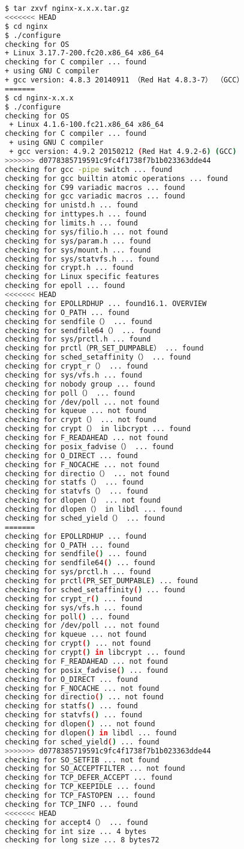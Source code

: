 \begin{lstlisting}[language=bash]
$ tar zxvf nginx-x.x.x.tar.gz
<<<<<<< HEAD
$ cd nginx
$ ./configure
checking for OS
+ Linux 3.17.7-200.fc20.x86_64 x86_64
checking for C compiler ... found
+ using GNU C compiler
+ gcc version: 4.8.3 20140911 （Red Hat 4.8.3-7） （GCC）
=======
$ cd nginx-x.x.x
$ ./configure
checking for OS
 + Linux 4.1.6-100.fc21.x86_64 x86_64
checking for C compiler ... found
 + using GNU C compiler
 + gcc version: 4.9.2 20150212 (Red Hat 4.9.2-6) (GCC) 
>>>>>>> d0778385719591c9fc4f1738f7b1b023363dde44
checking for gcc -pipe switch ... found
checking for gcc builtin atomic operations ... found
checking for C99 variadic macros ... found
checking for gcc variadic macros ... found
checking for unistd.h ... found
checking for inttypes.h ... found
checking for limits.h ... found
checking for sys/filio.h ... not found
checking for sys/param.h ... found
checking for sys/mount.h ... found
checking for sys/statvfs.h ... found
checking for crypt.h ... found
checking for Linux specific features
checking for epoll ... found
<<<<<<< HEAD
checking for EPOLLRDHUP ... found16.1. OVERVIEW
checking for O_PATH ... found
checking for sendfile（） ... found
checking for sendfile64（） ... found
checking for sys/prctl.h ... found
checking for prctl（PR_SET_DUMPABLE） ... found
checking for sched_setaffinity（） ... found
checking for crypt_r（） ... found
checking for sys/vfs.h ... found
checking for nobody group ... found
checking for poll（） ... found
checking for /dev/poll ... not found
checking for kqueue ... not found
checking for crypt（） ... not found
checking for crypt（） in libcrypt ... found
checking for F_READAHEAD ... not found
checking for posix_fadvise（） ... found
checking for O_DIRECT ... found
checking for F_NOCACHE ... not found
checking for directio（） ... not found
checking for statfs（） ... found
checking for statvfs（） ... found
checking for dlopen（） ... not found
checking for dlopen（） in libdl ... found
checking for sched_yield（） ... found
=======
checking for EPOLLRDHUP ... found
checking for O_PATH ... found
checking for sendfile() ... found
checking for sendfile64() ... found
checking for sys/prctl.h ... found
checking for prctl(PR_SET_DUMPABLE) ... found
checking for sched_setaffinity() ... found
checking for crypt_r() ... found
checking for sys/vfs.h ... found
checking for poll() ... found
checking for /dev/poll ... not found
checking for kqueue ... not found
checking for crypt() ... not found
checking for crypt() in libcrypt ... found
checking for F_READAHEAD ... not found
checking for posix_fadvise() ... found
checking for O_DIRECT ... found
checking for F_NOCACHE ... not found
checking for directio() ... not found
checking for statfs() ... found
checking for statvfs() ... found
checking for dlopen() ... not found
checking for dlopen() in libdl ... found
checking for sched_yield() ... found
>>>>>>> d0778385719591c9fc4f1738f7b1b023363dde44
checking for SO_SETFIB ... not found
checking for SO_ACCEPTFILTER ... not found
checking for TCP_DEFER_ACCEPT ... found
checking for TCP_KEEPIDLE ... found
checking for TCP_FASTOPEN ... found
checking for TCP_INFO ... found
<<<<<<< HEAD
checking for accept4（） ... found
checking for int size ... 4 bytes
checking for long size ... 8 bytes72


\end{lstlisting}
